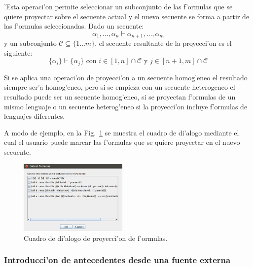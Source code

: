 'Esta operaci'on  permite seleccionar un subconjunto de las f'ormulas que se quiere proyectar sobre el secuente actual y el nuevo secuente se forma a partir de las f'ormulas seleccionadas.
Dado un secuente: $$ \alpha_1,\ldots,\alpha_n \vdash \alpha_{n+1},\ldots,\alpha_m $$
y un subconjunto $\mathcal{C} \subseteq \{1 \ldots m\}$, el secuente resultante de la proyecci'on es el siguiente:
$$\{\alpha_i \} \vdash \{\alpha_j\} \mbox{ con }i\in [1,n]\cap\mathcal{C} \mbox{ y } j\in [n+1, m]\cap\mathcal{C}$$

Si se aplica una operaci'on de proyecci'on a un secuente homog'eneo el resultado siempre ser'a homog'eneo, pero si se empieza con un secuente heterogeneo el resultado puede ser un secuente homog'eneo, si se proyectan f'ormulas de un mismo lenguaje o un secuente heterog'eneo si la proyecci'on incluye f'ormulas de lenguajes diferentes.

A modo de ejemplo, en la Fig.~\ref{seq selection} se muestra el cuadro de di'alogo mediante el cual el usuario puede marcar las f'ormulas que se quiere proyectar en el nuevo secuente.

\begin{figure}[tb]
	\includegraphics[width=200px]{img/select.png}
	\centering
	\caption{Cuadro de di'alogo de proyecci'on de f'ormulas.}
        \label{seq selection}
\end{figure}

\subsubsection{Introducci'on de antecedentes desde una fuente externa}

